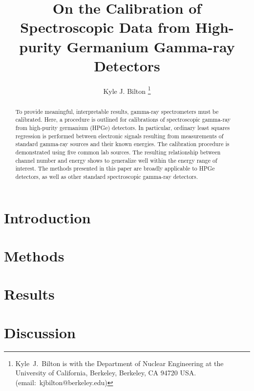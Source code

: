 \documentclass[journal]{IEEEtran}
\title{On the Calibration of Spectroscopic Data from High-purity Germanium Gamma-ray Detectors}
\author{Kyle J. Bilton%
\thanks{Kyle~J.~Bilton is with the Department of Nuclear Engineering at the University of California, Berkeley, Berkeley, CA 94720 USA. (email:~\mbox{kjbilton@berkeley.edu})}}
\begin{document}
\maketitle

\begin{abstract}
To provide meaningful, interpretable results, gamma-ray spectrometers must be calibrated.
Here, a procedure is outlined for calibrations of spectroscopic gamma-ray from high-purity germanium (HPGe) detectors.
In particular, ordinary least squares regression is performed between electronic signals resulting from measurements of standard gamma-ray sources and their known energies.
The calibration procedure is demonstrated using five common lab sources.
The resulting relationship between channel number and energy shows to generalize well within the energy range of interest.
The methods presented in this paper are broadly applicable to HPGe detectors, as well as other standard spectroscopic gamma-ray detectors.
\end{abstract}


\section{Introduction}
\label{sec:intro}


\section{Methods}
\label{sec:meth}


\section{Results}
\label{sec:res}


\section{Discussion}
\label{sec:disc}




\end{document}
